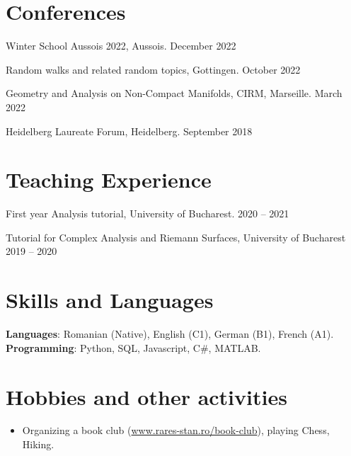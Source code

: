 \documentclass[a4paper, 11pt]{article}
\begin{document}
\section{Conferences}
\begin{itemize}[leftmargin=0.5cm]
	{\item{
			Winter School Aussois 2022, Aussois. 
			\hfill
			December 2022
	}}
	{\item{
			Random walks and related random topics, Gottingen. 
			\hfill
			October 2022
	}}
	{\item{
			Geometry and Analysis on Non-Compact Manifolds, CIRM, Marseille.
			\hfill
			March 2022
	}}
	{\item{
			Heidelberg Laureate Forum, Heidelberg.
			\hfill
			September 2018
	}}
	
\end{itemize}

\section{Teaching Experience}
\begin{itemize}[leftmargin=0.5cm]
		{\item{
			First year Analysis tutorial, University of Bucharest.
			\hfill
			2020 -- 2021
	}}
	{\item{
			Tutorial for Complex Analysis and Riemann Surfaces, University of Bucharest
			\hfill
			2019 -- 2020
	}}
\end{itemize}
 
\section{Skills and Languages}
\begin{itemize}[leftmargin=0.5cm, label={}]
	{\item{
			\textbf{Languages}{: Romanian (Native), English (C1), German (B1), French (A1).} \\
			\textbf{Programming}{: Python, SQL, Javascript, C\#, MATLAB.}
	}}
\end{itemize}

\section{Hobbies and other activities}
\begin{itemize}[leftmargin=0.5cm, label={}]
\item{
Organizing a book club (\href{https://www.rares-stan.ro/book-club}{www.rares-stan.ro/book-club}), playing Chess, Hiking.}
\end{itemize}
 
    
\end{document}
